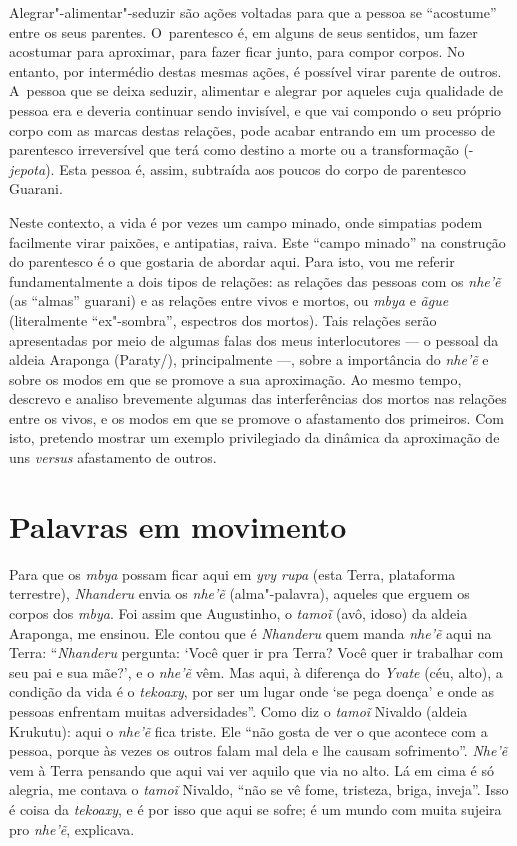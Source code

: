 Alegrar"-alimentar"-seduzir são ações voltadas para que a pessoa se
``acostume'' entre os seus parentes. O~parentesco é, em alguns de seus
sentidos, um fazer acostumar para aproximar, para fazer ficar junto,
para compor corpos. No entanto, por intermédio destas mesmas ações, é
possível virar parente de outros. A~pessoa que se deixa seduzir,
alimentar e alegrar por aqueles cuja qualidade de pessoa era e deveria
continuar sendo invisível, e que vai compondo o seu próprio corpo com
as marcas destas relações, pode acabar entrando em um processo de
parentesco irreversível que terá como destino a morte ou a
transformação (-\emph{jepota}). Esta pessoa é, assim, subtraída aos poucos do
corpo de parentesco Guarani.

Neste contexto, a vida é por vezes um campo minado, onde simpatias podem
facilmente virar paixões, e antipatias, raiva. Este ``campo minado'' na
construção do parentesco é o que gostaria de abordar aqui. Para isto,
vou me referir fundamentalmente a dois tipos de relações: as relações
das pessoas com os \emph{nhe’ẽ} (as ``almas'' guarani) e as relações entre
vivos e mortos, ou \emph{mbya} e \emph{ãgue} (literalmente ``ex"-sombra'', espectros dos
mortos). Tais relações serão apresentadas por meio de algumas falas dos
meus interlocutores --- o pessoal da aldeia Araponga (Paraty/),
principalmente ---, sobre a importância do \emph{nhe’ẽ} e sobre os modos
em que se promove a sua aproximação. Ao mesmo tempo, descrevo e analiso
brevemente algumas das interferências dos mortos nas relações entre os
vivos, e os modos em que se promove o afastamento dos primeiros. Com
isto, pretendo mostrar um exemplo privilegiado da dinâmica da
aproximação de uns \emph{versus} afastamento de outros.

\section{Palavras em movimento}

Para que os \emph{mbya} possam ficar aqui em \emph{yvy rupa} (esta Terra, plataforma
terrestre), \emph{Nhanderu} envia os \emph{nhe’ẽ} (alma"-palavra), aqueles que
erguem os corpos dos \emph{mbya}. Foi assim que Augustinho, o \emph{tamoĩ} (avô,
idoso) da aldeia Araponga, me ensinou. Ele contou que é \emph{Nhanderu} quem
manda \emph{nhe’ẽ} aqui na Terra: ``\emph{Nhanderu} pergunta: ‘Você quer ir pra
Terra? Você quer ir trabalhar com seu pai e sua mãe?’, e o \emph{nhe’ẽ}
vêm. Mas aqui, à diferença do \emph{Yvate} (céu, alto), a condição da vida é o
\emph{tekoaxy}, por ser um lugar onde `se pega doença' e onde as pessoas
enfrentam muitas adversidades''. Como diz o \emph{tamoĩ} Nivaldo (aldeia
Krukutu): aqui o \emph{nhe’ẽ} fica triste. Ele ``não gosta de ver o que
acontece com a pessoa, porque às vezes os outros falam mal dela e lhe
causam sofrimento''. \emph{Nhe’ẽ} vem à Terra pensando que aqui vai ver
aquilo que via no alto. Lá em cima é só
alegria, me contava o \emph{tamoĩ} Nivaldo, ``não se vê
fome, tristeza, briga, inveja''. Isso é coisa da \emph{tekoaxy}, e é por isso
que aqui se sofre; é um mundo com muita sujeira pro
\emph{nhe’ẽ}, explicava. 

